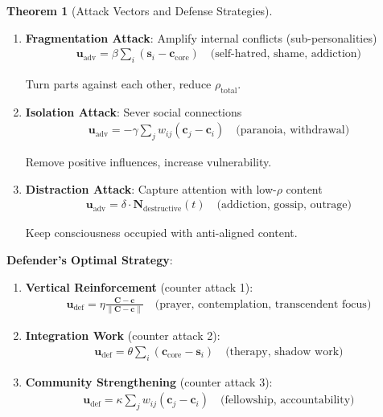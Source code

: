 \documentclass[11pt,a4paper]{article}
\theoremstyle{definition}
\newtheorem{theorem}{Theorem}[section]
\theoremstyle{remark}
\newcommand{\cc}{\mathbf{c}}
\begin{document}
\begin{small}
\begin{enumerate}
\begin{theorem}[Attack Vectors and Defense Strategies]
\begin{enumerate}
    \item \textbf{Fragmentation Attack}: Amplify internal conflicts (sub-personalities)
        \begin{align}
        \mathbf{u}_{\text{adv}} = \beta \sum_i (\mathbf{s}_i - \cc_{\text{core}}) \quad \text{(self-hatred, shame, addiction)}
        \end{align}
        
        Turn parts against each other, reduce \(\rho_{\text{total}}\).
    
    \item \textbf{Isolation Attack}: Sever social connections
        \begin{align}
        \mathbf{u}_{\text{adv}} = -\gamma \sum_j w_{ij}(\cc_j - \cc_i) \quad \text{(paranoia, withdrawal)}
        \end{align}
        
        Remove positive influences, increase vulnerability.
    
    \item \textbf{Distraction Attack}: Capture attention with low-\(\rho\) content
        \begin{align}
        \mathbf{u}_{\text{adv}} = \delta \cdot \mathbf{N}_{\text{destructive}}(t) \quad \text{(addiction, gossip, outrage)}
        \end{align}
        
        Keep consciousness occupied with anti-aligned content.
\end{enumerate}

\textbf{Defender's Optimal Strategy}:

\begin{enumerate}
    \item \textbf{Vertical Reinforcement} (counter attack 1):
        \begin{align}
        \mathbf{u}_{\text{def}} = \eta \frac{\mathbf{C} - \cc}{\|\mathbf{C} - \cc\|} \quad \text{(prayer, contemplation, transcendent focus)}
        \end{align}
    
    \item \textbf{Integration Work} (counter attack 2):
        \begin{align}
        \mathbf{u}_{\text{def}} = \theta \sum_i (\cc_{\text{core}} - \mathbf{s}_i) \quad \text{(therapy, shadow work)}
        \end{align}
    
    \item \textbf{Community Strengthening} (counter attack 3):
        \begin{align}
        \mathbf{u}_{\text{def}} = \kappa \sum_j w_{ij}(\cc_j - \cc_i) \quad \text{(fellowship, accountability)}
        \end{align}
    

\end{enumerate}
\end{theorem}
\end{enumerate}
\end{small}
\end{document}
